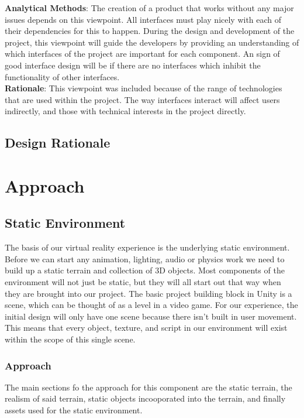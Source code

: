 \documentclass[10pt,journal,compsoc,onecolumn, draftclsnofoot]{IEEEtran}
\begin{document}
\hangindent=0.5cm \textbf{Analytical Methods}: The creation of a product that works without any major issues depends on this viewpoint.
All interfaces must play nicely with each of their dependencies for this to happen.
During the design and development of the project, this viewpoint will guide the developers by providing an understanding of which interfaces of the project are important for each component.
An sign of good interface design will be if there are no interfaces which inhibit the functionality of other interfaces.\\

\hangindent=0.5cm \textbf{Rationale}: This viewpoint was included because of the range of technologies that are used within the project.
The way interfaces interact will affect users indirectly, and those with technical interests in the project directly. \\


\subsection{Design Rationale}

\section{Approach}
\subsection{Static Environment}
The basis of our virtual reality experience is the underlying static
environment. Before we can start any animation, lighting, audio or physics
work we need to build up a static terrain and collection of 3D objects.
Most components of the environment will not just be static, but they will all
start out that way when they are brought into our project. The basic project
building block in Unity is a scene, which can be thought of as a level in a
video game. \cite{microsoft_mag} For our experience, the initial design will
only have one scene because there isn't built in user movement. This means that
every object, texture, and script in our environment will exist within the
scope of this single scene.

\subsubsection{Approach}
The main sections fo the approach for this component are the static terrain, the realism of said terrain, static objects incooporated into the terrain, and finally assets used for the static environment.\\
\end{document}
